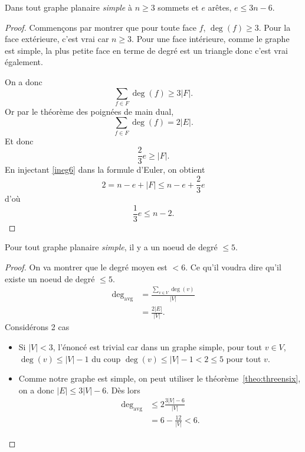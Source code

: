 \begin{mytheo}
  \label{theo:threensix}
  Dans tout graphe planaire \emph{simple} à $n \geq 3$ sommets et $e$ arêtes,
  $e \leq 3n - 6$.
  \begin{proof}
    Commençons par montrer que pour toute face $f$, $\deg(f) \geq 3$.
    Pour la face extérieure, c'est vrai car $n \geq 3$.
    Pour une face intérieure, comme le graphe est simple, la plus petite face en terme de degré est un triangle donc c'est vrai également.

    On a donc
    \[ \sum_{f \in F} \deg(f) \geq 3 |F|. \]
    Or par le théorème des poignées de main dual,
    \[ \sum_{f \in F} \deg(f) = 2 |E|. \]
    Et donc
    \begin{equation} \label{ineg6}
      \frac{2}{3} e \geq |F|.
    \end{equation}
    En injectant \ref{ineg6} dans la formule d'Euler, on obtient
    \[ 2 = n - e + |F| \leq n - e + \frac{2}{3}e \]
    d'où
    \[ \frac{1}{3}e \leq n - 2. \]
  \end{proof}
\end{mytheo}

\begin{mytheo}
  Pour tout graphe planaire \emph{simple}, il y a un noeud de degré $\leq 5$.
  \begin{proof}
    On va montrer que le degré moyen est $< 6$.
    Ce qu'il voudra dire qu'il existe un noeud de degré $\leq 5$.
    \begin{align*}
      \deg_{\mathrm{avg}} & = \frac{\sum_{v\in V} \deg(v)}{|V|}\\
                          & = \frac{2|E|}{|V|}.
    \end{align*}
    Considérons 2 cas
    \begin{itemize}
      \item Si $|V| < 3$, l'énoncé est trivial car dans un graphe simple,
        pour tout $v \in V$, $\deg(v) \leq |V|-1$ du coup
        $\deg(v) \leq |V| - 1 < 2 \leq 5$ pour tout $v$.
      \item
        Comme notre graphe est simple,
        on peut utiliser le théorème~\ref{theo:threensix},
        on a donc $|E| \leq 3|V| - 6$.
        Dès lors
        \begin{align*}
          \deg_{\mathrm{avg}} & \leq 2\frac{3|V|-6}{|V|}\\
                              & = 6 - \frac{12}{|V|} < 6.
        \end{align*}
    \end{itemize}
  \end{proof}
\end{mytheo}

